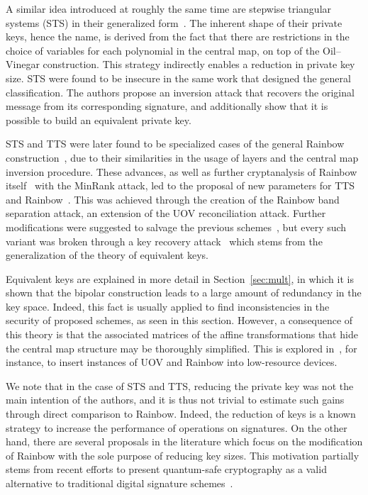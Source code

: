 \documentclass[12pt, a4paper, oneside]{memoir}
\theoremstyle{definition}
\begin{document}
A similar idea introduced at roughly the same time are stepwise triangular systems (STS) in their generalized form~\cite{Wolf:200603}. The inherent shape of their private keys, hence the name, is derived from the fact that there are restrictions in the choice of variables for each polynomial in the central map, on top of the Oil--Vinegar construction. This strategy indirectly enables a reduction in private key size. STS were found to be insecure in the same work that designed the general classification. The authors propose an inversion attack that recovers the original message from its corresponding signature, and additionally show that it is possible to build an equivalent private key.

STS and TTS were later found to be specialized cases of the general Rainbow construction~\cite{Ding:200806}, due to their similarities in the usage of layers and the central map inversion procedure. These advances, as well as further cryptanalysis of Rainbow itself~\cite{Billet:200609} with the MinRank attack, led to the proposal of new parameters for TTS and Rainbow~\cite{Ding:200806}. This was achieved through the creation of the Rainbow band separation attack, an extension of the UOV reconciliation attack. Further modifications were suggested to salvage the previous schemes~\cite{Tsujii:201005}, but every such variant was broken through a key recovery attack~\cite{Thomae:201207} which stems from the generalization of the theory of equivalent keys.

Equivalent keys are explained in more detail in Section~\ref{sec:mult}, in which it is shown that the bipolar construction leads to a large amount of redundancy in the key space. Indeed, this fact is usually applied to find inconsistencies in the security of proposed schemes, as seen in this section. However, a consequence of this theory is that the associated matrices of the affine transformations that hide the central map structure may be thoroughly simplified. This is explored in~\cite{Czypek:201209}, for instance, to insert instances of UOV and Rainbow into low-resource devices.

We note that in the case of STS and TTS, reducing the private key was not the main intention of the authors, and it is thus not trivial to estimate such gains through direct comparison to Rainbow. Indeed, the reduction of keys is a known strategy to increase the performance of operations on signatures. On the other hand, there are several proposals in the literature which focus on the modification of Rainbow with the sole purpose of reducing key sizes. This motivation partially stems from recent efforts to present quantum-safe cryptography as a valid alternative to traditional digital signature schemes~\cite{Bernstein:2008}.
\end{document}
